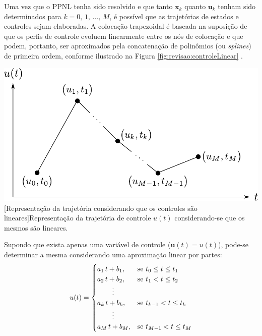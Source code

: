 Uma vez que o PPNL tenha sido resolvido e que tanto $ \mathbf{x}_k $ quanto $ \mathbf{u}_k $ tenham sido determinados para $ k = 0, \, 1, \, \dots, \, M $, é possível que as trajetórias de estados e controles sejam elaboradas. A colocação trapezoidal é baseada na suposição de que os perfis de controle evoluem linearmente entre os nós de colocação e que podem, portanto, ser aproximados pela concatenação de polinômios (ou \textit{splines}) de primeira ordem, conforme ilustrado na Figura \ref{fig:revisao:controleLinear} \cite{kelly_introduction_2017}. 

\noindent	
\begin{minipage}{\textwidth}
	\vspace{\onelineskip}
	\centering
	\includegraphics[width=0.8\linewidth]{draw/revisao/pdf/controleLinear}
	[Representação da trajetória considerando que os controles são lineares]{Representação da trajetória de controle $ u(t) $ considerando-se que os mesmos são lineares.}
	\label{fig:revisao:controleLinear}
	\vspace{\onelineskip}
\end{minipage}

Supondo que exista apenas uma variável de controle ($ \mathbf{u}(t) = u(t) $), pode-se determinar a mesma considerando uma aproximação linear por partes:
%
\begin{equation}
	\label{eq:revisao:uTrapInterp}
	u(t) = 
	\begin{cases} 
		a_1 \, t + b_1, & \mbox{se } t_0 \leq t \leq t_1 \\ 
		a_2 \, t + b_2, & \mbox{se } t_1 < t \leq t_2 \\ 
		\hspace{0.75cm} \vdots \\
		a_k \, t + b_k, & \mbox{se } t_{k-1} < t \leq t_{k} \\ 
		\hspace{0.75cm} \vdots \\
		a_M \, t + b_M, & \mbox{se } t_{M-1} < t \leq t_M 
	\end{cases}
\end{equation} 


